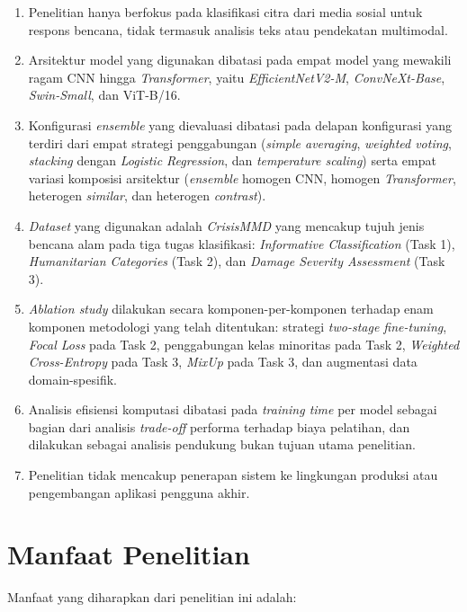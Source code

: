 \begin{enumerate}[noitemsep]
    \item Penelitian hanya berfokus pada klasifikasi citra dari media
    sosial untuk respons bencana, tidak termasuk analisis teks atau
    pendekatan multimodal.

    \item Arsitektur model yang digunakan dibatasi pada empat model yang
    mewakili ragam CNN hingga \textit{Transformer}, yaitu
    \textit{EfficientNetV2-M}, \textit{ConvNeXt-Base},
    \textit{Swin-Small}, dan ViT-B/16.

    \item Konfigurasi \textit{ensemble} yang dievaluasi dibatasi pada
    delapan konfigurasi yang terdiri dari empat strategi penggabungan
    (\textit{simple averaging}, \textit{weighted voting},
    \textit{stacking} dengan \textit{Logistic Regression}, dan
    \textit{temperature scaling}) serta empat variasi komposisi
    arsitektur (\textit{ensemble} homogen CNN, homogen
    \textit{Transformer}, heterogen \textit{similar}, dan heterogen
    \textit{contrast}).

    \item \textit{Dataset} yang digunakan adalah \textit{CrisisMMD}
    yang mencakup tujuh jenis bencana alam pada tiga tugas klasifikasi:
    \textit{Informative Classification} (Task 1), \textit{Humanitarian
    Categories} (Task 2), dan \textit{Damage Severity Assessment}
    (Task 3).

    \item \textit{Ablation study} dilakukan secara komponen-per-komponen
    terhadap enam komponen metodologi yang telah ditentukan: strategi
    \textit{two-stage fine-tuning}, \textit{Focal Loss} pada Task 2,
    penggabungan kelas minoritas pada Task 2, \textit{Weighted
    Cross-Entropy} pada Task 3, \textit{MixUp} pada Task 3, dan
    augmentasi data domain-spesifik.

    \item Analisis efisiensi komputasi dibatasi pada \textit{training
    time} per model sebagai bagian dari analisis \textit{trade-off}
    performa terhadap biaya pelatihan, dan dilakukan sebagai analisis
    pendukung bukan tujuan utama penelitian.

    \item Penelitian tidak mencakup penerapan sistem ke lingkungan
    produksi atau pengembangan aplikasi pengguna akhir.
\end{enumerate}


\section{Manfaat Penelitian} \label{I.Manfaat}
Manfaat yang diharapkan dari penelitian ini adalah: \par

